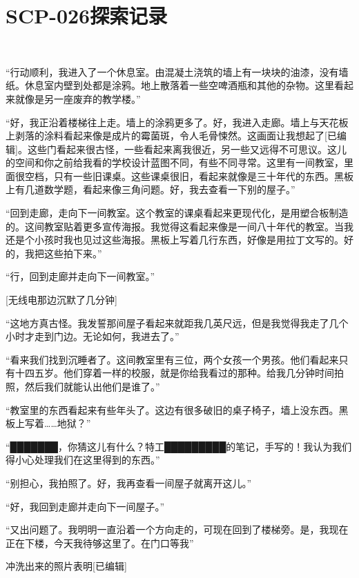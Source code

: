 \section{
    SCP-026探索记录
}

\label{sec:DOC-026-exploration-logs}

\\

“行动顺利，我进入了一个休息室。由混凝土浇筑的墙上有一块块的油漆，没有墙纸。休息室内壁到处都是涂鸦。地上散落着一些空啤酒瓶和其他的杂物。这里看起来就像是另一座废弃的教学楼。”

“好，我正沿着楼梯往上走。墙上的涂鸦更多了。好，我进入走廊。墙上与天花板上剥落的涂料看起来像是成片的霉菌斑，令人毛骨悚然。这画面让我想起了{[}已编辑]。这些门看起来很古怪，一些看起来离我很近，另一些又远得不可思议。这儿的空间和你之前给我看的学校设计蓝图不同，有些不同寻常。这里有一间教室，里面很空档，只有一些旧课桌。这些课桌很旧，看起来就像是三十年代的东西。黑板上有几道数学题，看起来像三角问题。好，我去查看一下别的屋子。”

“回到走廊，走向下一间教室。这个教室的课桌看起来更现代化，是用塑合板制造的。这间教室贴着更多宣传海报。我觉得这看起来像是一间八十年代的教室。当我还是个小孩时我也见过这些海报。黑板上写着几行东西，好像是用拉丁文写的。好的，我把这些拍下来。”

“行，回到走廊并走向下一间教室。”

{[}无线电那边沉默了几分钟]

“这地方真古怪。我发誓那间屋子看起来就距我几英尺远，但是我觉得我走了几个小时才走到门边。无论如何，我进去了。”

“看来我们找到沉睡者了。这间教室里有三位，两个女孩一个男孩。他们看起来只有十四五岁。他们穿着一样的校服，就是你给我看过的那种。给我几分钟时间拍照，然后我们就能认出他们是谁了。”

“教室里的东西看起来有些年头了。这边有很多破旧的桌子椅子，墙上没东西。黑板上写着……地狱？”

“███████，你猜这儿有什么？特工█████████的笔记，手写的！我认为我们得小心处理我们在这里得到的东西。”

“别担心，我拍照了。好，我再查看一间屋子就离开这儿。”

“好，我回到走廊并走向下一间屋子。”

“又出问题了。我明明一直沿着一个方向走的，可现在回到了楼梯旁。是，我现在正在下楼，今天我待够这里了。在门口等我”

冲洗出来的照片表明{[}已编辑]

\\

